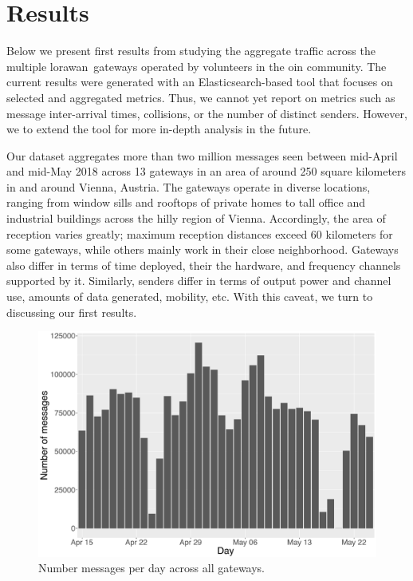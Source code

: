 \section{Results}\label{sec:results}

Below we present first results from studying the aggregate
traffic across the multiple \gls{lorawan} gateways operated
by volunteers in the \gls{oin} community.
The current results were generated with an Elasticsearch-based
tool that focuses on selected and aggregated metrics.
Thus, we
cannot yet report on metrics such as message inter-arrival times,
collisions, or the number of distinct senders. However, we
to extend the tool for more in-depth analysis in the future.

Our dataset aggregates more than two million messages seen between
mid-April and mid-May 2018 across 13 gateways in an area of around
250 square kilometers in and around Vienna, Austria.
The gateways operate in diverse locations, ranging from window sills
and rooftops of private homes to tall office and industrial buildings
across the hilly region of Vienna. Accordingly, the area of reception
varies greatly; maximum reception distances exceed 60 kilometers for
some gateways, while others mainly work in their close neighborhood.
Gateways also differ in terms of time deployed, their the hardware, and
frequency channels supported by it. Similarly, senders differ
in terms of output power and channel use, amounts of data generated,
mobility, etc.
With this caveat, we turn to discussing our first results.

\begin{figure}
  \centering
  \includegraphics[width=\columnwidth]{figures/counts.pdf}
  \caption{Number messages per day across all gateways.}
  \label{fig:counts}
\end{figure}

